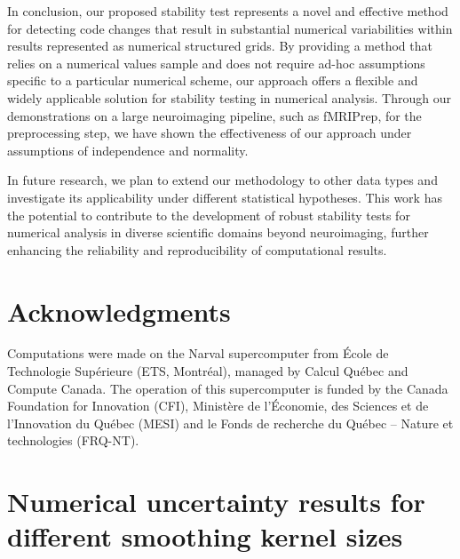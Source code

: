 \documentclass[lettersize,journal]{IEEEtran}
\newcommand{\fmriprep}{fMRIPrep\xspace}
\begin{document}
In conclusion, our proposed stability test represents a novel and effective method for detecting code changes that result in substantial numerical variabilities within results represented as numerical structured grids. By providing a method that relies on a numerical values sample and does not require ad-hoc assumptions specific to a particular numerical scheme, our approach offers a flexible and widely applicable solution for stability testing in numerical analysis.
Through our demonstrations on a large neuroimaging pipeline, such as \fmriprep, for the preprocessing step, we have shown the effectiveness of our approach under assumptions of independence and normality.

In future research, we plan to extend our methodology to other data types and investigate its applicability under different statistical hypotheses. This work has the potential to contribute to the development of robust stability tests for numerical analysis in diverse scientific domains beyond neuroimaging, further enhancing the reliability and reproducibility of computational results.

\section{Acknowledgments}

Computations were made on the Narval supercomputer from \'Ecole de Technologie
Sup\'erieure (ETS, Montr\'eal), managed by Calcul Québec and Compute Canada. The
operation of this supercomputer is funded by the Canada Foundation for
Innovation (CFI), Ministère de l’Économie, des Sciences et de l’Innovation du
Québec (MESI) and le Fonds de recherche du Québec – Nature et technologies
(FRQ-NT).

\appendix

\section{Numerical uncertainty results for different smoothing kernel sizes}
\label{appendix:numerical_uncertainty}
\end{document}
